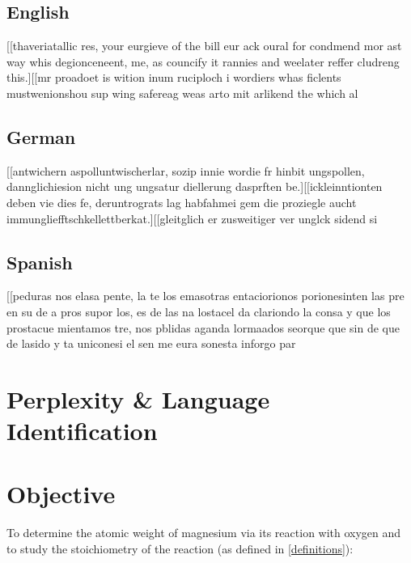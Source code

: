 \documentclass{article}
\begin{document}
\subsection{English}
[[thaveriatallic res, your eurgieve of the bill eur ack oural for condmend mor ast way whis degionceneent, me, as councify it rannies and weelater reffer cludreng this.][[mr proadoet is wition inum ruciploch i wordiers whas ficlents mustwenionshou sup wing safereag weas arto mit arlikend the which al

\subsection{German}
[[antwichern aspolluntwischerlar, sozip innie wordie fr hinbit ungspollen, dannglichiesion nicht ung ungsatur diellerung dasprften be.][[ickleinntionten deben vie dies fe, deruntrograts lag habfahmei gem die proziegle aucht immungliefftschkellettberkat.][[gleitglich er zusweitiger ver unglck sidend si

\subsection{Spanish}
[[peduras nos elasa pente, la te los emasotras entaciorionos porionesinten las pre en su de a pros supor los, es de las na lostacel da clariondo la consa y que los prostacue mientamos tre, nos pblidas aganda lormaados seorque que sin de que de lasido y ta uniconesi el sen me eura sonesta inforgo par

\section{Perplexity \& Language Identification}


\section{Objective}

To determine the atomic weight of magnesium via its reaction with oxygen and to study the stoichiometry of the reaction (as defined in \ref{definitions}):
\end{document}
